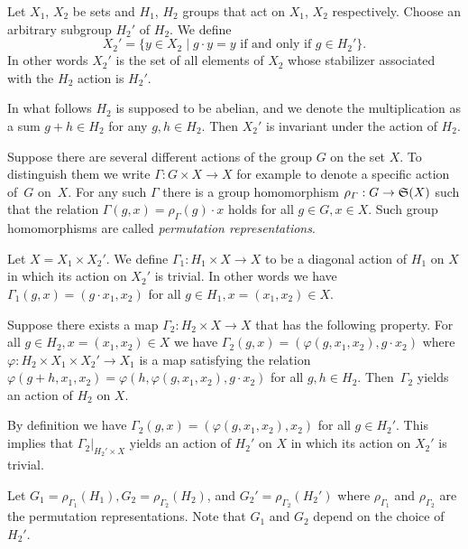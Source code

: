 \documentclass[11pt]{article}
\begin{document}
Let $X_1$, $X_2$ be sets and $H_1$, $H_2$ groups that act on $X_1$, $X_2$ respectively.
Choose an arbitrary subgroup $H_2'$ of $H_2$.
We def\/ine
\begin{equation}\label{eq:apr21_1}
X_2' = \{ y \in X_2 \mid g \cdot y = y \mbox{ if and only if } g \in H_2' \}.
\end{equation}
In other words $X_2'$ is the set of all elements of $X_2$ whose stabilizer
associated with the $H_2$ action is $H_2'$.


In what follows $H_2$ is supposed to be abelian, and we denote the multiplication as a sum $g+h \in H_2$
for any $g, h \in H_2$.
Then $X_2'$ is invariant under the action of $H_2$.

\begin{remark}\label{rem:apr21_2}
Suppose there are several dif\/ferent actions of the group $G$ on the set $X$.
To distinguish them we write
$\varGamma : G \times X \rightarrow X$ for example to denote
a specif\/ic action of~$G$ on~$X$.
For any such $\varGamma$
there is a
group homomorphism $\rho_{\varGamma} : G \rightarrow {\frak S}(X)$ such that
the relation $\varGamma (g,x) = \rho_{\varGamma} (g) \cdot x$ holds
for all $g \in G, x \in X$.
Such group homomorphisms are called {\em permutation representations}.
\end{remark}

Let $X = X_1 \times X_2'$.
We def\/ine $\varGamma_1 : H_1 \times X \rightarrow X$
to be a diagonal action of
$H_1$ on $X$
in which its action on $X_2'$ is trivial.
In other words we have
$\varGamma_1(g, x) = (g \cdot x_1, x_2)$ for all $g \in H_1, x =(x_1,x_2) \in X$.

Suppose there exists a map $\varGamma_2 : H_2 \times X \rightarrow X$
that has the following property.
For all $g \in H_2, x =(x_1,x_2) \in X$ we have
$\varGamma_2(g, x) = (\varphi (g, x_1,x_2), g \cdot x_2)$ where
$\varphi : H_2 \times X_1 \times X_2' \rightarrow X_1$ is a map
satisfying the relation $\varphi (g + h, x_1,x_2) = \varphi (h , \varphi (g, x_1,x_2),g \cdot x_2)$ for all $g,h \in H_2$.
Then~$\varGamma_2$ yields an action of $H_2$ on $X$.

By def\/inition we have
$\varGamma_2(g, x) = (\varphi (g, x_1,x_2), x_2)$ for all $g \in H_2'$.
This implies that $\varGamma_2 |_{H_2' \times X}$ yields an action of $H_2'$ on $X$ in which its action on $X_2'$ is trivial.

Let $G_1 = \rho_{\varGamma_1} (H_1), G_2 = \rho_{\varGamma_2} (H_2)$, and $G_2' = \rho_{\varGamma_2} (H_2')$
where $\rho_{\varGamma_1}$ and $\rho_{\varGamma_2}$ are the permutation representations.
Note that $G_1$ and $G_2$
depend on the choice of $H_2'$.
\end{document}
